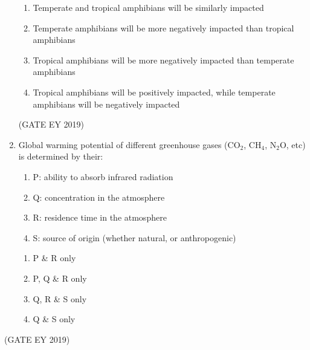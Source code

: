 \documentclass[journal,12pt,onecolumn]{IEEEtran}
\theoremstyle{remark}
\begin{document}
\begin{enumerate}
\begin{enumerate}
\item Temperate and tropical amphibians will be similarly impacted
\item Temperate amphibians will be more negatively impacted than tropical amphibians
\item Tropical amphibians will be more negatively impacted than temperate amphibians
\item Tropical amphibians will be positively impacted, while temperate amphibians will be negatively impacted
\end{enumerate}


\hfill{(GATE EY 2019)}
\item Global warming potential of different greenhouse gases (CO$_2$, CH$_4$, N$_2$O, etc) is determined by their:
\begin{enumerate}
\item P: ability to absorb infrared radiation
\item Q: concentration in the atmosphere
\item R: residence time in the atmosphere
\item S: source of origin (whether natural, or anthropogenic)
\end{enumerate}
 

\begin{multicols}{2}
\begin{enumerate}
\item P \& R only
\item P, Q \& R only
\item Q, R \& S only
\item Q \& S only
\end{enumerate}
\end{multicols}
\end{enumerate}
\hfill{(GATE EY 2019)}
\end{document}
